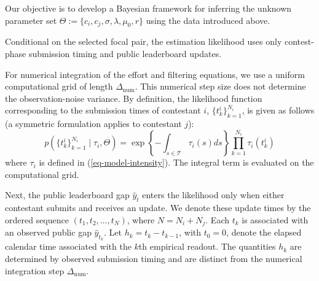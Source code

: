 \documentclass[mnsc]{informs3}
\begin{document}
Our objective is to develop a Bayesian framework for inferring the unknown parameter set $\Theta := \{ c_i, c_j, \sigma, \lambda, \mu_0,r \}$ using the data introduced above.

Conditional on the selected focal pair, the estimation likelihood uses only contest-phase submission timing and public leaderboard updates.

For numerical integration of the effort and filtering equations, we use a uniform computational grid of length $\Delta_{\mathrm{num}}$. This numerical step size does not determine the observation-noise variance.
By definition, the likelihood function corresponding to the submission times of contestant $i$, $\{t^i_k\}_{k=1}^{N_i}$, is given as follows (a symmetric formulation applies to contestant $j$):
\begin{equation}\label{eq-ihpp-prob}
p\left(\{t^i_k\}_{k=1}^{N_i}\mid\tau_i,\Theta\right)
=
\exp\left\{-\int_{s\in\mathcal T}\tau_i(s)ds\right\}
\prod_{k=1}^{N_i}\tau_i(t^i_k)
\end{equation}
where $\tau_i$ is defined in (\ref{eq-model-intensity}).
The integral term is evaluated on the computational grid.

Next, the public leaderboard gap $\hat y_t$ enters the likelihood only when either contestant submits and receives an update.
We denote these update times by the ordered sequence $(t_1,t_2,\ldots,t_N)$, where $N=N_i+N_j$.
Each $t_k$ is associated with an observed public gap $\hat{y}_{t_k}$.
Let $h_k=t_k-t_{k-1}$, with $t_0=0$, denote the elapsed calendar time associated with the $k$th empirical readout. The quantities $h_k$ are determined by observed submission timing and are distinct from the numerical integration step $\Delta_{\mathrm{num}}$.
\end{document}
